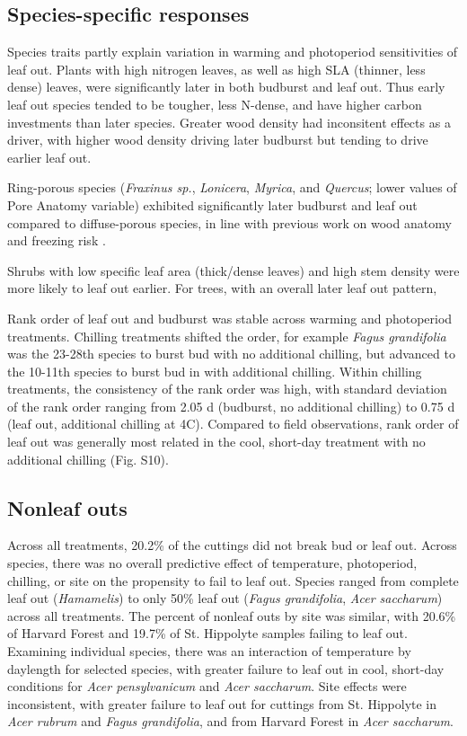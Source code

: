 \documentclass[12pt]{article}
\begin{document}
\subsection*{Species-specific responses}

Species traits partly explain variation in warming and photoperiod sensitivities of leaf out. Plants with high nitrogen leaves, as well as high SLA (thinner, less dense) leaves, were significantly later in both budburst and leaf out. Thus early leaf out species tended to be tougher, less N-dense, and have higher carbon investments than later species. Greater wood density had inconsitent effects as a driver, with higher wood density driving later budburst but tending to drive earlier leaf out.

Ring-porous species (\emph{Fraxinus sp.}, \emph{Lonicera}, \emph{Myrica}, and \emph{Quercus}; lower values of Pore Anatomy variable) exhibited significantly later budburst and leaf out compared to diffuse-porous species, in line with previous work on wood anatomy and freezing risk \cite{Sperry:1992}.

Shrubs with low specific leaf area (thick/dense leaves) and high stem density were more likely to leaf out earlier. For trees, with an overall later leaf out pattern, 

Rank order of leaf out and budburst was stable across warming and photoperiod treatments. Chilling treatments shifted the order, for example \emph{Fagus grandifolia} was the 23-28th species to burst bud with no additional chilling, but advanced to the 10-11th species to burst bud in with additional chilling. Within chilling treatments, the consistency of the rank order was high, with standard deviation of the rank order ranging from 2.05 d (budburst, no additional chilling) to 0.75 d (leaf out, additional chilling at 4\degree C). Compared to field observations, rank order of leaf out was generally most related in the cool, short-day treatment with no additional chilling (Fig. S10).

\subsection*{Nonleaf outs}

Across all treatments, 20.2\% of the cuttings did not break bud or leaf out. Across species, there was no overall predictive effect of temperature, photoperiod, chilling, or site on the propensity to fail to leaf out. Species ranged from complete leaf out (\emph{Hamamelis}) to only 50\% leaf out (\emph{Fagus grandifolia}, \emph{Acer saccharum}) across all treatments. The percent of nonleaf outs by site was similar, with 20.6\% of Harvard Forest and 19.7\% of St. Hippolyte samples failing to leaf out. Examining individual species,  there was an interaction of temperature by daylength for selected species, with greater failure to leaf out in cool, short-day conditions for \emph{Acer pensylvanicum}  and \emph{Acer saccharum}. Site effects were inconsistent, with greater failure to leaf out for cuttings from St. Hippolyte in \emph{Acer rubrum} and \emph{Fagus grandifolia}, and from Harvard Forest in \emph{Acer saccharum}. 
\end{document}
